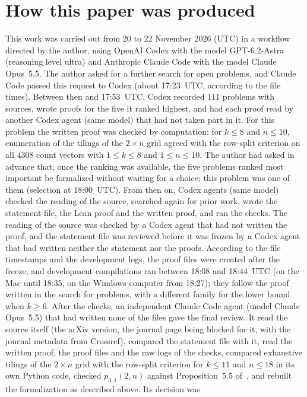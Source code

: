 \documentclass[11pt]{article}
\theoremstyle{definition}
\theoremstyle{remark}
\begin{document}
\section*{How this paper was produced}
This work was carried out from 20 to 22 November 2026 (UTC) in a workflow directed by
the author, using OpenAI Codex with the model GPT-6.2-Astra (reasoning level
ultra) and Anthropic Claude Code with the model Claude Opus~5.5. The author
asked for a further search for open problems, and Claude Code passed this
request to Codex (about 17:23~UTC, according to the file times). Between then
and 17:53~UTC, Codex recorded $111$ problems with sources, wrote proofs for
the five it ranked highest, and had each proof read by another Codex agent
(same model) that had not taken part in it. For this problem the written
proof was checked by computation: for $k\le8$ and $n\le10$, enumeration of
the tilings of the $2\times n$ grid agreed with the row-split criterion on all $4308$
count vectors with $1\le k\le8$ and $1\le n\le10$. The author had asked in advance that, once the ranking
was available, the five problems ranked most important be formalized without
waiting for a choice; this problem was one of them (selection at
18:00~UTC). From then on, Codex
agents (same model) checked the reading of the source, searched again for
prior work, wrote the statement file, the Lean proof and the written proof,
and ran the checks. The reading of the source was checked by a Codex agent
that had not written the proof, and the statement file was reviewed before
it was frozen by a Codex agent that had written neither the statement nor the
proofs. According to the file timestamps and the development logs, the proof files were created after the freeze, and development compilations
ran between 18:08 and 18:44~UTC (on the Mac until 18:35, on the Windows
computer from 18:27);
they follow the proof written in the search for problems, with a different
family for the lower bound when $k\ge6$. After the checks, an independent
Claude Code agent (model Claude Opus~5.5) that had written none of the files
gave the final review. It read the source itself (the arXiv version, the
journal page being blocked for it, with the journal metadata from Crossref),
compared the statement file with it, read the written proof, the proof files
and the raw logs of the checks, compared exhaustive tilings of the $2\times n$
grid with the row-split criterion for $k\le11$ and $n\le18$ in its own Python
code, checked $p_{3,1}(2,n)$ against Proposition~5.5 of~\cite{gvz}, and
rebuilt the formalization as described above. Its decision was
\end{document}
